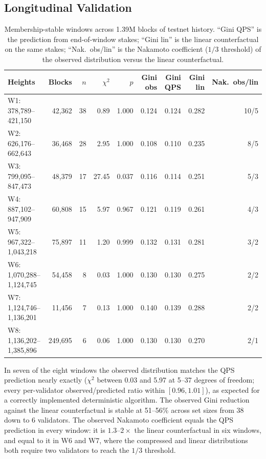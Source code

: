 \documentclass[11pt,a4paper]{article}
\begin{document}
\subsection{Longitudinal Validation}
\label{sec:windows}

\begin{table}[H]
\centering
\small
\begin{tabular}{lrrrrrrrr}
\toprule
Heights & Blocks & $n$ & $\chi^2$ & $p$ & Gini obs & Gini QPS & Gini lin & Nak.\ obs/lin \\
\midrule
W1: 378{,}789--421{,}150 & 42{,}362 & 38 & 0.89 & 1.000 & 0.124 & 0.124 & 0.282 & 10/5 \\
W2: 626{,}176--662{,}643 & 36{,}468 & 28 & 2.95 & 1.000 & 0.108 & 0.110 & 0.235 & 8/5 \\
W3: 799{,}095--847{,}473 & 48{,}379 & 17 & 27.45 & 0.037 & 0.116 & 0.114 & 0.251 & 5/3 \\
W4: 887{,}102--947{,}909 & 60{,}808 & 15 & 5.97 & 0.967 & 0.121 & 0.119 & 0.261 & 4/3 \\
W5: 967{,}322--1{,}043{,}218 & 75{,}897 & 11 & 1.20 & 0.999 & 0.132 & 0.131 & 0.281 & 3/2 \\
W6: 1{,}070{,}288--1{,}124{,}745 & 54{,}458 & 8 & 0.03 & 1.000 & 0.130 & 0.130 & 0.275 & 2/2 \\
W7: 1{,}124{,}746--1{,}136{,}201 & 11{,}456 & 7 & 0.13 & 1.000 & 0.140 & 0.139 & 0.288 & 2/2 \\
W8: 1{,}136{,}202--1{,}385{,}896 & 249{,}695 & 6 & 0.06 & 1.000 & 0.130 & 0.130 & 0.270 & 2/1 \\
\bottomrule
\end{tabular}
\caption{Membership-stable windows across 1.39M blocks of testnet history. ``Gini QPS'' is the prediction from end-of-window stakes; ``Gini lin'' is the linear counterfactual on the same stakes; ``Nak.\ obs/lin'' is the Nakamoto coefficient ($1/3$ threshold) of the observed distribution versus the linear counterfactual.}
\label{tab:longitudinal}
\end{table}

In seven of the eight windows the observed distribution matches the QPS prediction nearly exactly ($\chi^2$ between 0.03 and 5.97 at 5--37 degrees of freedom; every per-validator observed/predicted ratio within $[0.96, 1.01]$), as expected for a correctly implemented deterministic algorithm. The observed Gini reduction against the linear counterfactual is stable at 51--56\% across set sizes from 38 down to 6 validators. The observed Nakamoto coefficient equals the QPS prediction in every window: it is $1.3$--$2\times$ the linear counterfactual in six windows, and equal to it in W6 and W7, where the compressed and linear distributions both require two validators to reach the $1/3$ threshold.
\end{document}
